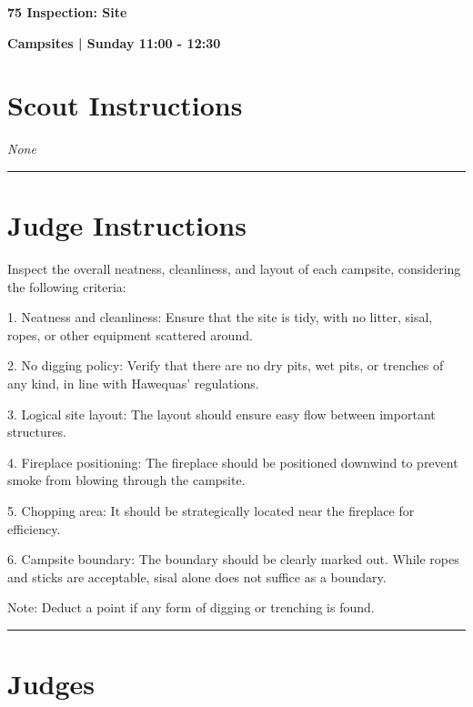 \documentclass[10pt]{article}
\newcommand{\newtitle}[1]{\begin{center}{\Huge\bfseries #1 }\\ \vspace{5mm}\end{center}}
\newcommand{\newsubtitle}[1]{\begin{center}{\color{grey}\Large\bfseries #1 }\\ \vspace{5mm}\end{center}}
\begin{document}
	\vspace{1cm}


	\clearpage
		\newtitle{75 Inspection: Site }
	\newsubtitle{Campsites | Sunday 11:00 - 12:30}
		\setcounter{section}{74}
	\section*{Scout Instructions}
		\textit{None}
	
	\vspace{0.5cm}
	\hrule
	\vspace{0.5cm}

		\section*{Judge Instructions}
		Inspect the overall neatness, cleanliness, and layout of each campsite, considering the following criteria:



1. Neatness and cleanliness: Ensure that the site is tidy, with no litter, sisal, ropes, or other equipment scattered around.

2. No digging policy: Verify that there are no dry pits, wet pits, or trenches of any kind, in line with Hawequas' regulations.

3. Logical site layout: The layout should ensure easy flow between important structures. 

4. Fireplace positioning: The fireplace should be positioned downwind to prevent smoke from blowing through the campsite.

5. Chopping area: It should be strategically located near the fireplace for efficiency.

6. Campsite boundary: The boundary should be clearly marked out. While ropes and sticks are acceptable, sisal alone does not suffice as a boundary.



Note: Deduct a point if any form of digging or trenching is found.


\vspace{0.5cm}
	\hrule
	\vspace{0.5cm}
		\section*{\faUsers \: Judges}

		
\end{document}
